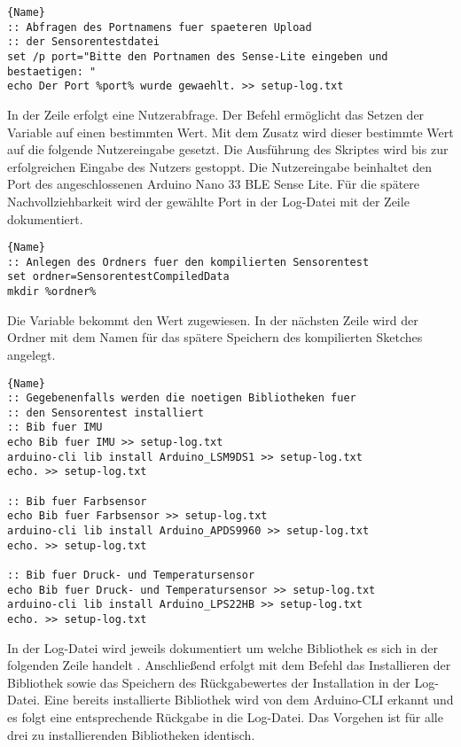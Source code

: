 \begin{lstlisting}{Name}
:: Abfragen des Portnamens fuer spaeteren Upload 
:: der Sensorentestdatei
set /p port="Bitte den Portnamen des Sense-Lite eingeben und bestaetigen: "
echo Der Port %port% wurde gewaehlt. >> setup-log.txt
\end{lstlisting}

In der Zeile  erfolgt eine Nutzerabfrage. Der Befehl  ermöglicht das Setzen der Variable  auf einen bestimmten Wert. Mit dem Zusatz  wird dieser bestimmte Wert auf die folgende Nutzereingabe gesetzt. Die Ausführung des Skriptes wird bis zur erfolgreichen Eingabe des Nutzers gestoppt. Die Nutzereingabe beinhaltet den Port des angeschlossenen Arduino Nano 33 BLE Sense Lite. Für die spätere Nachvollziehbarkeit wird der gewählte Port in der Log-Datei mit der Zeile  dokumentiert. 

\begin{lstlisting}{Name}
:: Anlegen des Ordners fuer den kompilierten Sensorentest
set ordner=SensorentestCompiledData
mkdir %ordner%
\end{lstlisting}

Die Variable  bekommt den Wert  zugewiesen. In der nächsten Zeile  wird der Ordner mit dem Namen  für das spätere Speichern des kompilierten Sketches angelegt.

\begin{lstlisting}{Name}
:: Gegebenenfalls werden die noetigen Bibliotheken fuer 
:: den Sensorentest installiert
:: Bib fuer IMU
echo Bib fuer IMU >> setup-log.txt
arduino-cli lib install Arduino_LSM9DS1 >> setup-log.txt
echo. >> setup-log.txt
    
:: Bib fuer Farbsensor
echo Bib fuer Farbsensor >> setup-log.txt
arduino-cli lib install Arduino_APDS9960 >> setup-log.txt
echo. >> setup-log.txt
    
:: Bib fuer Druck- und Temperatursensor
echo Bib fuer Druck- und Temperatursensor >> setup-log.txt
arduino-cli lib install Arduino_LPS22HB >> setup-log.txt
echo. >> setup-log.txt
\end{lstlisting}

In der Log-Datei wird jeweils dokumentiert um welche Bibliothek es sich in der folgenden Zeile handelt . Anschließend erfolgt mit dem Befehl  das Installieren der Bibliothek sowie das Speichern des Rückgabewertes der Installation in der Log-Datei. Eine bereits installierte Bibliothek wird von dem Arduino-CLI erkannt und es folgt eine entsprechende Rückgabe in die Log-Datei. Das Vorgehen ist für alle drei zu installierenden Bibliotheken identisch.

